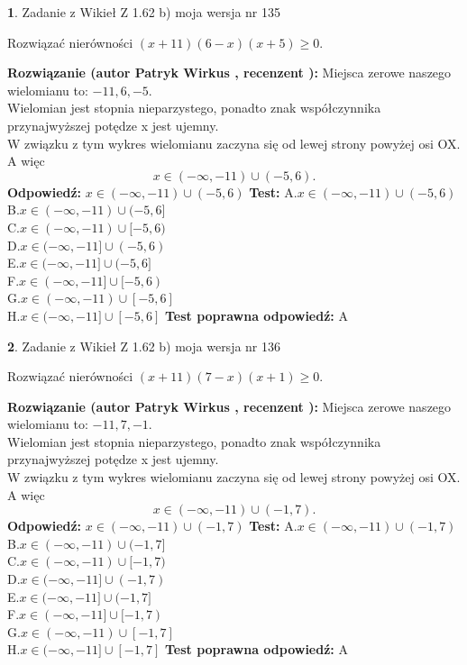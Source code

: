 \documentclass[12pt, a4paper]{article}
\theoremstyle{definition} %
\newtheorem{zad}{}
\newcommand{\zadStart}[1]{\begin{zad}#1\newline}
\newcommand{\zadStop}{\end{zad}}
\newcommand{\rozwStart}[2]{\noindent \textbf{Rozwiązanie (autor #1 , recenzent #2): }\newline}
\newcommand{\rozwStop}{\newline}
\newcommand{\odpStart}{\noindent \textbf{Odpowiedź:}\newline}
\newcommand{\odpStop}{\newline}
\newcommand{\testStart}{\noindent \textbf{Test:}\newline}
\newcommand{\testStop}{\newline}
\newcommand{\kluczStart}{\noindent \textbf{Test poprawna odpowiedź:}\newline}
\newcommand{\kluczStop}{\newline}
\begin{document}
\zadStart{Zadanie z Wikieł Z 1.62 b) moja wersja nr 135}

Rozwiązać nierówności $(x+11)(6-x)(x+5)\ge0$.
\zadStop
\rozwStart{Patryk Wirkus}{}
Miejsca zerowe naszego wielomianu to: $-11, 6, -5$.\\
Wielomian jest stopnia nieparzystego, ponadto znak współczynnika przy\linebreak najwyższej potędze x jest ujemny.\\ W związku z tym wykres wielomianu zaczyna się od lewej strony powyżej osi OX. A więc $$x \in (-\infty,-11) \cup (-5,6).$$
\rozwStop
\odpStart
$x \in (-\infty,-11) \cup (-5,6)$
\odpStop
\testStart
A.$x \in (-\infty,-11) \cup (-5,6)$\\
B.$x \in (-\infty,-11) \cup (-5,6]$\\
C.$x \in (-\infty,-11) \cup [-5,6)$\\
D.$x \in (-\infty,-11] \cup (-5,6)$\\
E.$x \in (-\infty,-11] \cup (-5,6]$\\
F.$x \in (-\infty,-11] \cup [-5,6)$\\
G.$x \in (-\infty,-11) \cup [-5,6]$\\
H.$x \in (-\infty,-11] \cup [-5,6]$
\testStop
\kluczStart
A
\kluczStop



\zadStart{Zadanie z Wikieł Z 1.62 b) moja wersja nr 136}

Rozwiązać nierówności $(x+11)(7-x)(x+1)\ge0$.
\zadStop
\rozwStart{Patryk Wirkus}{}
Miejsca zerowe naszego wielomianu to: $-11, 7, -1$.\\
Wielomian jest stopnia nieparzystego, ponadto znak współczynnika przy\linebreak najwyższej potędze x jest ujemny.\\ W związku z tym wykres wielomianu zaczyna się od lewej strony powyżej osi OX. A więc $$x \in (-\infty,-11) \cup (-1,7).$$
\rozwStop
\odpStart
$x \in (-\infty,-11) \cup (-1,7)$
\odpStop
\testStart
A.$x \in (-\infty,-11) \cup (-1,7)$\\
B.$x \in (-\infty,-11) \cup (-1,7]$\\
C.$x \in (-\infty,-11) \cup [-1,7)$\\
D.$x \in (-\infty,-11] \cup (-1,7)$\\
E.$x \in (-\infty,-11] \cup (-1,7]$\\
F.$x \in (-\infty,-11] \cup [-1,7)$\\
G.$x \in (-\infty,-11) \cup [-1,7]$\\
H.$x \in (-\infty,-11] \cup [-1,7]$
\testStop
\kluczStart
A
\kluczStop
\end{document}
